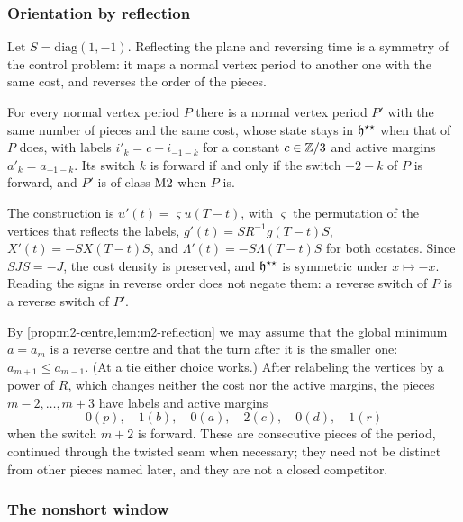 \subsubsection{Orientation by reflection}\label{sec:m2-reflection}

Let $S=\mathrm{diag}(1,-1)$. Reflecting the plane and reversing time is a symmetry of the control
problem: it maps a normal vertex period to another one with the same cost, and reverses the order of
the pieces.

\begin{lemma}[Reflection]\label{lem:m2-reflection}
For every normal vertex period $P$ there is a normal vertex period $P'$ with the same number of
pieces and the same cost, whose state stays in $\mathfrak{h}^{\star\star}$ when that of $P$ does, with labels
$i'_k=c-i_{-1-k}$ for a constant $c\in\mathbb{Z}/3$ and active margins $a'_k=a_{-1-k}$. Its switch $k$ is
forward if and only if the switch $-2-k$ of $P$ is forward, and $P'$ is of class $\mathrm{M2}$ when $P$
is.
\end{lemma}

The construction is $u'(t)=\varsigma u(T-t)$, with $\varsigma$ the permutation of the vertices that
reflects the labels, $g'(t)=SR^{-1}g(T-t)S$, $X'(t)=-SX(T-t)S$, and $\Lambda'(t)=-S\Lambda(T-t)S$ for
both costates. Since $SJS=-J$, the cost density is preserved, and $\mathfrak{h}^{\star\star}$ is symmetric under
$x\mapsto-x$. Reading the signs in reverse order does not negate them: a reverse switch of $P$
is a reverse switch of $P'$.

By \cref{prop:m2-centre,lem:m2-reflection} we may assume that the global minimum $a=a_m$ is a
reverse centre and that the turn after it is the smaller one: $a_{m+1}\le a_{m-1}$. (At a tie either
choice works.) After relabeling the vertices by a power of $R$, which changes neither the cost nor
the active margins, the pieces $m-2,\dots,m+3$ have labels and active margins
\begin{equation}\label{eq:m2-labels}
0(p),\quad 1(b),\quad 0(a),\quad 2(c),\quad 0(d),\quad 1(r)
\end{equation}
when the switch $m+2$ is forward.
These are consecutive pieces of the period, continued through the twisted seam when necessary; they
need not be distinct from other pieces named later, and they are not a closed competitor.

\subsubsection{The nonshort window}\label{sec:m2-window}


